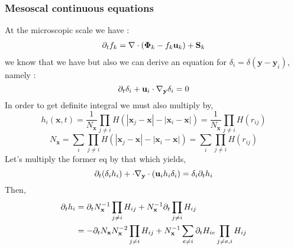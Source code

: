\subsubsection{Mesoscal continuous equations}

At the microscopic scale we have : 
\begin{align}
    \partial_t f_k
    &= \mathbf{\nabla} \cdot (\mathbf{\Phi}_k - f_k \textbf{u}_k)
    + \textbf{S}_k
    \label{eq:dt_f_k}\\
\end{align}
we know that we have 
but also we can derive an equation for $\delta_i = \delta(\textbf{y}-\textbf{y}_i)$, namely : 
\begin{equation}
    \partial_t \delta_i
    + \textbf{u}_i \cdot \mathbf{\nabla}_\textbf{y}    \delta_i
    = 0 
\end{equation}
In order to get definite integral we must also multiply by,
\begin{equation*}
    h_{i}(\textbf{x},t) 
    = \frac{1}{N_\textbf{x}}
    \prod_{j \neq i}
    H(|\textbf{x}_j - \textbf{x}| - |\textbf{x}_i - \textbf{x}|)
    = \frac{1}{N_\textbf{x}}
    \prod_{j \neq i}
    H(r_{ij})
\end{equation*}
\begin{equation*}
    N_\textbf{x}
    = 
    \sum_{i}
    \prod_{j\neq i}
    H(|\textbf{x}_j - \textbf{x}| - |\textbf{x}_i - \textbf{x}|)
    = 
    \sum_{i}
    \prod_{j\neq i}
    H(r_{ij})
\end{equation*}
Let's multiply the former eq by that which yields, 
\begin{equation}
    \partial_t (\delta_ih_i)
    +  \cdot \mathbf{\nabla}_\textbf{y}  \cdot  (\textbf{u}_i h_i\delta_i)
    = \delta_i \partial_t h_i
\end{equation}
Then, 
\begin{align*}
    \partial_t h_i
    &= 
    \partial_t N_\textbf{x}^{-1} \prod_{j\neq i} H_{ij}
    + N_\textbf{x}^{-1} \partial_t \prod_{j\neq i} H_{ij}\\
    &= 
    - \partial_t N_\textbf{x} N_\textbf{x}^{-2} \prod_{j\neq i} H_{ij}
    + N_\textbf{x}^{-1} \sum_{e \neq i} \partial_t H_{ie} \prod_{j\neq e,i} H_{ij}
\end{align*}